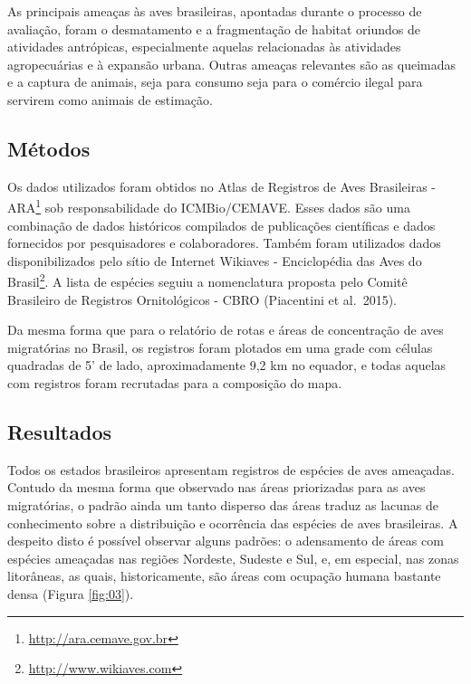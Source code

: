 \documentclass[
  oneside]{scrbook}
\DeclareRobustCommand{\href}[2]{#2\footnote{\url{#1}}}
\begin{document}
As principais ameaças às aves brasileiras, apontadas durante o processo de avaliação, foram o desmatamento e a fragmentação de habitat oriundos de atividades antrópicas, especialmente aquelas relacionadas às atividades agropecuárias e à expansão urbana. Outras ameaças relevantes são as queimadas e a captura de animais, seja para consumo seja para o comércio ilegal para servirem como animais de estimação.

\hypertarget{metodos2}{%
\subsection{Métodos}\label{metodos2}}

Os dados utilizados foram obtidos no Atlas de \href{http://ara.cemave.gov.br}{Registros de Aves Brasileiras - ARA} sob responsabilidade do ICMBio/CEMAVE. Esses dados são uma combinação de dados históricos compilados de publicações científicas e dados fornecidos por pesquisadores e colaboradores. Também foram utilizados dados disponibilizados pelo sítio de Internet \href{http://www.wikiaves.com}{Wikiaves - Enciclopédia das Aves do Brasil}. A lista de espécies seguiu a nomenclatura proposta pelo Comitê Brasileiro de Registros Ornitológicos - CBRO (Piacentini et al.~2015).

Da mesma forma que para o relatório de rotas e áreas de concentração de aves migratórias no Brasil, os registros foram plotados em uma grade com células quadradas de 5' de lado, aproximadamente 9,2 km no equador, e todas aquelas com registros foram recrutadas para a composição do mapa.

\hypertarget{resultados2}{%
\subsection{Resultados}\label{resultados2}}

Todos os estados brasileiros apresentam registros de espécies de aves ameaçadas. Contudo da mesma forma que observado nas áreas priorizadas para as aves migratórias, o padrão ainda um tanto disperso das áreas traduz as lacunas de conhecimento sobre a distribuição e ocorrência das espécies de aves brasileiras. A despeito disto é possível observar alguns padrões: o adensamento de áreas com espécies ameaçadas nas regiões Nordeste, Sudeste e Sul, e, em especial, nas zonas litorâneas, as quais, historicamente, são áreas com ocupação humana bastante densa (Figura \ref{fig:03}).
\end{document}
